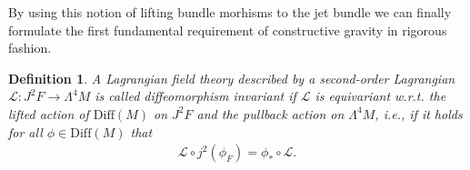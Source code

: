 \documentclass[%
 reprint,
nofootinbib,
 amsmath,amssymb,
 aps,
 prd,
floatfix,
]{revtex4-2}
\newtheorem{definition}{Definition}
\begin{document}
By using this notion of lifting bundle morhisms to the jet bundle we can finally formulate the first fundamental requirement of constructive gravity in rigorous fashion. 
\begin{definition}
A Lagrangian field theory described by a second-order Lagrangian $\mathcal{L} : J^2F \rightarrow \Lambda^4 M$ is called diffeomorphism invariant if $\mathcal{L}$ is equivariant w.r.t. the lifted action of $\mathrm{Diff}(M)$ on $J^2F$ and the pullback action on $\Lambda^4M$, i.e., if it holds for all $\phi \in \mathrm{Diff}(M)$ that 
\begin{align}\label{DiffeoReq}\tag{Axiom 1}
     \mathcal{L}\circ j^2(\phi_F) = \phi_{\ast} \circ \mathcal{L}.
\end{align}
\end{definition}
\end{document}
